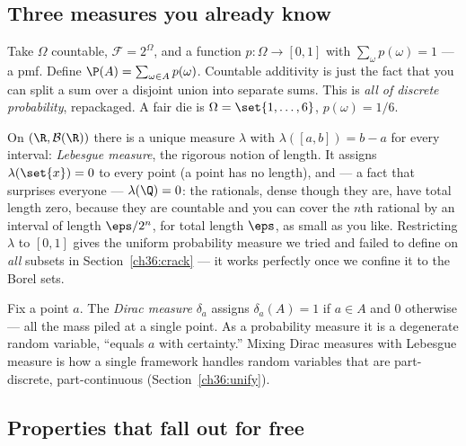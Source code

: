\subsection{Three measures you already know}

\begin{example}
\label{ch36:counting}
Take $\Omega$ countable, $\mathcal{F} = 2^{\Omega}$, and a function
$p : \Omega \to [0,1]$ with $\sum_{\omega} p(\omega) = 1$ --- a pmf. Define
$\P(A) = \sum_{\omega \in A} p(\omega)$. Countable additivity is just the fact
that you can split a sum over a disjoint union into separate sums. This is
\emph{all of discrete probability}, repackaged. A fair die is
$\Omega = \set{1,\dots,6}$, $p(\omega) = 1/6$.
\end{example}

\begin{example}
\label{ch36:lebesgue}
On $(\R, \mathcal{B}(\R))$ there is a unique measure $\lambda$ with
$\lambda([a,b]) = b - a$ for every interval: \emph{Lebesgue measure}, the rigorous
notion of length. It assigns $\lambda(\set{x}) = 0$ to every point (a point has no
length), and --- a fact that surprises everyone --- $\lambda(\Q) = 0$: the
rationals, dense though they are, have total length zero, because they are
countable and you can cover the $n$th rational by an interval of length
$\eps/2^n$, for total length $\eps$, as small as you like. Restricting $\lambda$
to $[0,1]$ gives the uniform probability measure we tried and failed to define on
\emph{all} subsets in Section~\ref{ch36:crack} --- it works perfectly once we
confine it to the Borel sets.
\end{example}

\begin{example}
\label{ch36:dirac}
Fix a point $a$. The \emph{Dirac measure} $\delta_a$ assigns $\delta_a(A) = 1$ if
$a \in A$ and $0$ otherwise --- all the mass piled at a single point. As a
probability measure it is a degenerate random variable, ``equals $a$ with
certainty.'' Mixing Dirac measures with Lebesgue measure is how a single framework
handles random variables that are part-discrete, part-continuous
(Section~\ref{ch36:unify}).
\end{example}

\subsection{Properties that fall out for free}

